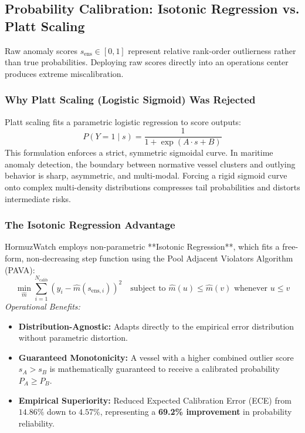 \subsection{Probability Calibration: Isotonic Regression vs. Platt Scaling}
Raw anomaly scores $s_{\text{ens}} \in [0, 1]$ represent relative rank-order outlierness rather than true probabilities. Deploying raw scores directly into an operations center produces extreme miscalibration.

\subsubsection{Why Platt Scaling (Logistic Sigmoid) Was Rejected}
Platt scaling fits a parametric logistic regression to score outputs:
\begin{equation}
P(Y = 1 \mid s) = \frac{1}{1 + \exp(A \cdot s + B)}
\end{equation}
This formulation enforces a strict, symmetric sigmoidal curve. In maritime anomaly detection, the boundary between normative vessel clusters and outlying behavior is sharp, asymmetric, and multi-modal. Forcing a rigid sigmoid curve onto complex multi-density distributions compresses tail probabilities and distorts intermediate risks.

\subsubsection{The Isotonic Regression Advantage}
HormuzWatch employs non-parametric **Isotonic Regression**, which fits a free-form, non-decreasing step function using the Pool Adjacent Violators Algorithm (PAVA):
\begin{equation}
\min_{\hat{m}} \sum_{i=1}^{N_{\text{calib}}} \left( y_i - \hat{m}(s_{\text{ens}, i}) \right)^2 \quad \text{subject to } \hat{m}(u) \le \hat{m}(v) \text{ whenever } u \le v
\end{equation}
\textit{Operational Benefits:}
\begin{itemize}[leftmargin=*]
    \item \textbf{Distribution-Agnostic:} Adapts directly to the empirical error distribution without parametric distortion.
    \item \textbf{Guaranteed Monotonicity:} A vessel with a higher combined outlier score $s_A > s_B$ is mathematically guaranteed to receive a calibrated probability $P_A \ge P_B$.
    \item \textbf{Empirical Superiority:} Reduced Expected Calibration Error (ECE) from $14.86\%$ down to $4.57\%$, representing a \textbf{69.2\% improvement} in probability reliability.
\end{itemize}

